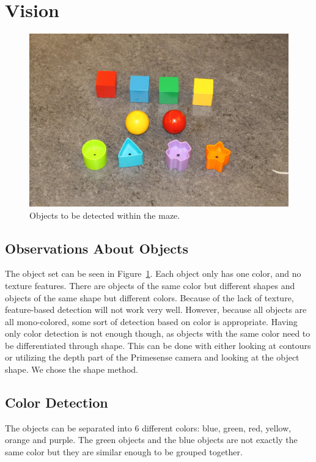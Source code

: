 \documentclass[10pt,a4paper,twocolumn]{article}
\begin{document}
\section{Vision}
\begin{figure}
  \centering
  \includegraphics[width=\linewidth]{images/objects.jpg}
  \caption{Objects to be detected within the maze.}
  \label{fig:shapes}
\end{figure}
\subsection{Observations About Objects}
The object set can be seen in Figure~\ref{fig:shapes}. Each object only has one
color, and no texture features. There are objects of the same color but
different shapes and objects of the same shape but different colors. Because of
the lack of texture, feature-based detection\cite{feature} will not work very
well. However, because all objects are all mono-colored, some sort of detection
based on color is appropriate. Having only color detection is not enough though,
as objects with the same color need to be differentiated through shape. This can
be done with either looking at contours or utilizing the depth part of the
Primesense camera and looking at the object shape. We chose the shape method.

\subsection{Color Detection}
The objects can be separated into 6 different colors: blue, green, red, yellow,
orange and purple. The green objects and the blue objects are not exactly the
same color but they are similar enough to be grouped together.
\end{document}

